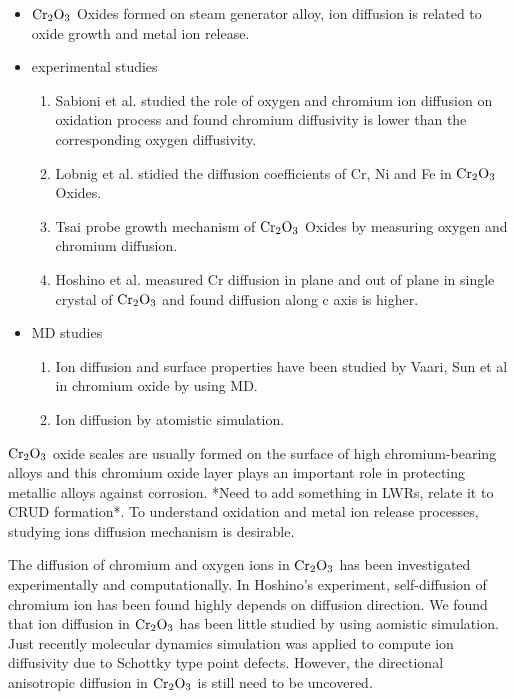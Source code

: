 \documentclass[twocolumn,showpacs,preprintnumbers,amsmath,amssymb,superscriptaddress,prb]{revtex4}
\begin{document}
\begin{itemize}
	\item $\textup{Cr}_2\textup{O}_3$ Oxides formed on steam generator alloy, ion diffusion is related to oxide growth and metal ion release. 
	\item experimental studies 
	\begin{enumerate}
		\item Sabioni et al. studied the role of oxygen and chromium ion diffusion on oxidation process and found chromium diffusivity is lower than the corresponding oxygen diffusivity. \cite{sabioni2012role}
		\item Lobnig et al. stidied the diffusion coefficients of Cr, Ni and Fe in $\textup{Cr}_2\textup{O}_3$ Oxides.\cite{lobnig1992diffusion} 
		\item Tsai \cite{tsai1996growth} probe growth mechanism of $\textup{Cr}_2\textup{O}_3$ Oxides by measuring oxygen and chromium diffusion. 
		\item Hoshino et al. measured Cr diffusion in plane and out of plane in single crystal of $\textup{Cr}_2\textup{O}_3$ and found diffusion along c axis is higher.  \cite{hoshino1983cation}
	\end{enumerate}
	\item MD studies 
	
    \begin{enumerate}
	   \item Ion diffusion \cite{vaari2015molecular} and surface properties \cite{sun2007molecular} have been studied by Vaari, Sun et al in chromium oxide by using MD. 
		 \item Ion diffusion by atomistic simulation. \cite{catlow1988atomistic} 
    \end{enumerate}
\end{itemize}

$\textup{Cr}_2\textup{O}_3$ oxide scales are usually formed on the surface of high chromium-bearing alloys and this chromium oxide layer plays an important role in protecting metallic alloys against corrosion. *Need to add something in LWRs, relate it to CRUD formation*. To understand oxidation and metal ion release processes, studying ions diffusion mechanism is desirable.  

\par The diffusion of chromium and oxygen ions in $\textup{Cr}_2\textup{O}_3$ has been investigated experimentally\cite{sabioni2012role,lobnig1992diffusion,tsai1996growth,hoshino1983cation} and computationally\cite{catlow1988atomistic,vaari2015molecular}. In Hoshino's experiment, self-diffusion of chromium ion has been found highly depends on diffusion direction. We found that ion diffusion in $\textup{Cr}_2\textup{O}_3$ has been little studied by using aomistic simulation. Just recently molecular dynamics simulation was applied to compute ion diffusivity due to Schottky type point defects. However, the directional anisotropic diffusion in $\textup{Cr}_2\textup{O}_3$ is still need to be uncovered.
\end{document}
